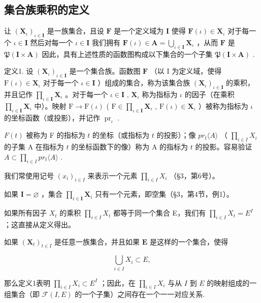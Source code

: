 \subsection{集合族乘积的定义}

让 \((\mathbf{X}_{\iota})_{\iota \in \mathbf{I}}\) 是一族集合，且设 \(\mathbf{F}\) 是一个定义域为 \(\mathbf{I}\) 使得 \(\mathbf{F}(\iota) \in \mathbf{X}_{\iota}\) 对于每一个 \(\iota \in \mathbf{I}\) 然后对每一个 \(\iota \in \mathbf{I}\) 我们拥有 \(\mathbf{F}(\iota) \in \mathbf{A} = \bigcup_{\iota \in \mathbf{I}} \mathbf{X}_{\iota}\) ，从而 \(\mathbf{F}\) 是 \(\mathfrak{P}(\mathbf{I} \times \mathbf{A})\) 因此，具有上述性质的函数图构成以下集合的一个子集 \(\mathfrak{P}(\mathbf{I} \times \mathbf{A})\) .

定义1. 设 \((\mathbf{X}_{\iota})_{\iota \in \mathbf{I}}\) 是一个集合族。函数图 \(\mathbf{F}\) （以 I 为定义域，使得 \(\mathrm{F}(\iota) \in \mathbf{X}_{\iota}\) 对于每一个 \(\iota \in \mathbf{I}\) ）组成的集合，称为该集合族 \((\mathbf{X}_{\iota})_{\iota \in \mathbf{I}}\) 的乘积，并且记作 \(\prod_{\iota \in \mathbf{I}} \mathbf{X}_{\iota}\) 。对于每一个 \(\iota \in \mathbf{I}\) , \(\mathbf{X}_{\iota}\) 称为指标为 \(\iota\) 的因子（在乘积 \(\prod_{\iota \in \mathbf{I}} \mathbf{X}_{\iota}\) 中）。映射 \(\mathrm{F} \to \mathrm{F}(\iota)\) ( \(\mathrm{F} \in \prod_{\iota \in \mathbf{I}} \mathbf{X}_{\iota}\) , \(\mathrm{F}(\iota) \in \mathbf{X}_{\iota}\) ）被称为指标为 \(\iota\) 的坐标函数（或投影），并记作 \(\operatorname{pr}_{\iota}\) .

\(F(t)\) 被称为 F 的指标为 \(t\) 的坐标（或指标为 \(t\) 的投影）；像 \(pr_{t}\langle A\rangle\) （ \(\prod_{i\in I}X_{i}\) 的子集 A 在指标为 \(t\) 的坐标函数下的像）称为 A 的指标为 \(t\) 的投影。容易验证 \(A\subset\prod_{i\in I}pr_{t}\langle A\rangle\) .

我们常使用记号 \((x_{i})_{i\in I}\) 来表示一个元素 \(\prod_{i\in I}X_{i}\) （§3，第6号）。

如果 \(\mathbf{I} = \varnothing\) ，集合 \(\prod_{i\in \mathbf{I}}\mathbf{X}_i\) 只有一个元素，即空集（§3，第4节，例1）。

如果所有因子 \(X_{t}\) 的乘积 \(\prod_{i\in I}X_{t}\) 都等于同一个集合 E，我们有 \(\prod_{i\in I}X_{t}=E^{I}\) ；这直接从定义得出。

如果 \((\mathbf{X}_t)_{t\in I}\) 是任意一族集合，并且如果 \(\mathbf{E}\) 是这样的一个集合，使得

\[
\bigcup_ {i \in I} X _ {i} \subset E,
\]

那么定义1表明 \(\prod_{i\in I}X_i\subset E^I\) ；因此，在 \(\prod_{i\in I}X_i\) 与从 \(I\) 到 \(E\) 的映射组成的一组集合（即 \(\mathcal{F}(I,E)\) 的一个子集）之间存在一个一一对应关系.

